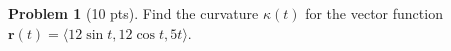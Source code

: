 \documentclass[12pt]{article}
\theoremstyle{definition}
\newtheorem{problem}{Problem}
\begin{document}
\begin{problem}[10  pts]
Find the curvature $\kappa(t)$ for the vector function $\boldsymbol{r}(t) = \langle 12 \sin t, 12 \cos t, 5t \rangle$. 
\vspace{6cm}
\begin{flushright}
\end{flushright}
\end{problem}
\end{document}

